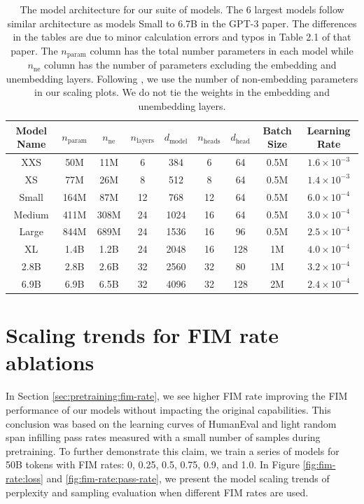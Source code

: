 \documentclass[postscript]{article}
\newcommand\Tstrut{\rule{0pt}{2.6ex}}
\begin{document}
\begin{table}[ht!]
\centering
\begin{tabular}{ccccccccc}
\hline\Tstrut
Model Name  & $n_{\text{param}}$ & $n_{\text{ne}}$ & $n_{\text{layers}}$ & $d_{\text{model}}$ & $n_{\text{heads}}$ & $d_{\text{head}}$ & Batch Size &  Learning Rate  \\[0.1cm]
\hline\Tstrut
XXS & 50M & 11M &  6 & 384 & 6 & 64 & 0.5M & $1.6 \times 10^{-3}$  \\
XS & 77M & 26M & 8 & 512 & 8 & 64 & 0.5M & $1.4 \times 10^{-3}$  \\
Small & 164M & 87M & 12 & 768 & 12 & 64 & 0.5M & $6.0 \times 10^{-4}$  \\
Medium & 411M & 308M & 24 & 1024 & 16 & 64 & 0.5M & $3.0 \times 10^{-4}$  \\
Large & 844M & 689M & 24 & 1536 & 16 & 96 & 0.5M & $2.5 \times 10^{-4}$  \\
XL & 1.4B & 1.2B & 24 & 2048 & 16 & 128 & 1M & $4.0 \times 10^{-4}$  \\
2.8B & 2.8B & 2.6B & 32 &  2560 & 32 & 80 & 1M & $3.2 \times 10^{-4}$  \\
6.9B & 6.9B & 6.5B & 32 &  4096 & 32 & 128 & 2M & $2.4 \times 10^{-4}$  \\
\hline
\end{tabular}
\caption{The model architecture for our suite of models. The 6 largest models follow similar architecture as models Small to 6.7B in the GPT-3 paper. The differences in the tables are due to minor calculation errors and typos in Table 2.1 of that paper. The $n_{\text{param}}$ column has the total number parameters in each model while $n_{\text{ne}}$ column has the number of parameters excluding the embedding and unembedding layers. Following \citep{scaling_laws}, we use the number of non-embedding parameters in our scaling plots. We do not tie the weights in the embedding and unembedding layers. } 
\label{tab:arch}
\end{table}

\section{Scaling trends for FIM rate ablations}\label{appendix:more_fim_rate}
In Section \ref{sec:pretraining:fim-rate}, we see higher FIM rate improving the FIM performance of our models without impacting the original capabilities. This conclusion was based on the learning curves of HumanEval and light random span infilling pass rates measured with a small number of samples during pretraining. To further demonstrate this claim, we train a series of models for 50B tokens with FIM rates: 0, 0.25, 0.5, 0.75, 0.9, and 1.0. In Figure \ref{fig:fim-rate:loss} and \ref{fig:fim-rate:pass-rate}, we present the model scaling trends of perplexity and sampling evaluation when different FIM rates are used.
\end{document}
